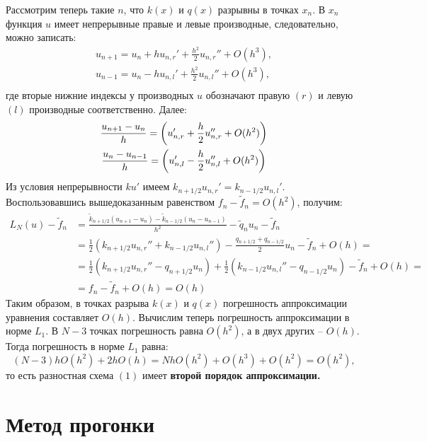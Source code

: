 \documentclass[titlepage]{article}
\def\l{\left}
\def\r{\right}
\begin{document}
Рассмотрим теперь такие $n$, что $k(x)$ и $q(x)$ разрывны в точках $x_n$. В $x_n$ функция $u$ имеет непрерывные правые и левые производные, следовательно, можно записать:
\begin{gather*}
	u_{n+1} = u_n + hu_{n,r}' + \frac{h^2}{2}u_{n,r}'' + O(h^3), \\
	u_{n-1} = u_n - hu_{n,l}' + \frac{h^2}{2}u_{n,l}'' + O(h^3), \\
\end{gather*}
где вторые нижние индексы у производных $u$ обозначают правую $(r)$ и левую $(l)$ производные соответственно. Далее:
\begin{gather*}
	\notag \frac{u_{n+1} - u_n}{h} = \l(u_{n,r}' + \frac{h}{2}u_{n,r}'' + O(h^2) \r) \\
	\notag \frac{u_n - u_{n-1}}{h} = \l(u_{n,l}' - \frac{h}{2}u_{n,l}'' + O(h^2) \r)
\end{gather*}
Из условия непрерывности $ku'$ имеем $k_{n+1/2}u_{n,r}' = k_{n-1/2}u_{n,l}'$. Воспользовавшись вышедоказанным равенством $f_n - \tilde f_n = O(h^2)$, получим:
\begin{align*}
	L_{N}(u) - \tilde f_n &= \frac{\tilde{k}_{n + 1/2}(u_{n+1}-u_n) - \tilde{k}_{n - 1/2}(u_n - u_{n-1})}{h^2} - \tilde q_n u_n - \tilde f_n \\ 
	&= \frac{1}{2}(k_{n+1/2}u_{n,r}'' + k_{n-1/2}u_{n,l}'') - \frac{q_{n+1/2}+q_{n-1/2}}{2}u_n - \tilde f_n + O(h) = \\
	&= \frac{1}{2}(k_{n+1/2}u_{n,r}'' - q_{n+1/2}u_n) + \frac{1}{2}(k_{n-1/2}u_{n,l}'' - q_{n-1/2}u_n) - \tilde f_n + O(h) = \\ 
	&= f_n - \tilde f_n + O(h) = O(h)
\end{align*}
Таким образом, в точках разрыва $k(x)$ и $q(x)$ погрешность аппроксимации уравнения составляет $O(h)$. 
Вычислим теперь погрешность аппроксимации в норме $L_1$. В $N-3$ точках погрешность равна $O(h^2)$, а в двух других -- $O(h)$. Тогда погрешность в норме $L_1$ равна:
$$(N-3)hO(h^2) + 2hO(h) = NhO(h^2) + O(h^3) + O(h^2) = O(h^2),$$
то есть разностная схема $(1)$ имеет \textbf{второй порядок аппроксимации.}
\section{Метод прогонки}
\end{document}
